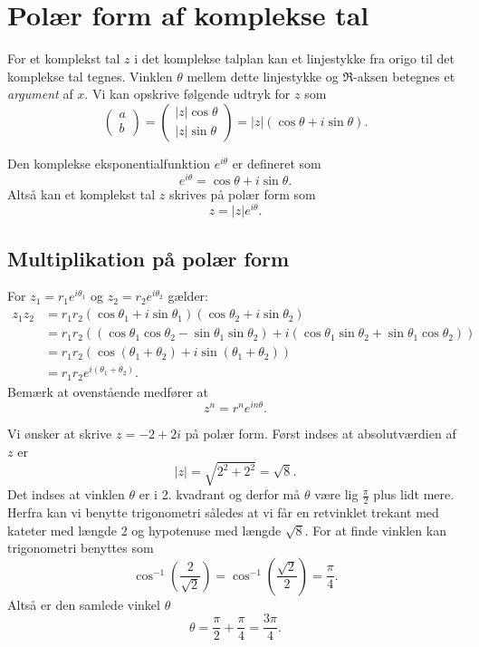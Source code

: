 \section{Polær form af komplekse tal}
For et komplekst tal $z$ i det komplekse talplan kan et linjestykke fra origo til det komplekse tal tegnes. Vinklen $\theta$ mellem dette linjestykke og $\Re$-aksen betegnes et \textit{argument} af $x$. Vi kan opskrive følgende udtryk for $z$ som
\[ 
\begin{pmatrix}
  a \\
  b
\end{pmatrix}
=
\begin{pmatrix}
  |z| \cos\theta \\
  |z| \sin\theta
\end{pmatrix}
=
|z|(\cos\theta + i \sin\theta)
.\]

\begin{definition} 
  Den komplekse eksponentialfunktion $e^{i\theta}$ er defineret som
  \[ 
  e^{i\theta} = \cos\theta + i \sin\theta
  .\]
  Altså kan et komplekst tal $z$ skrives på polær form som
  \[ 
  z = |z|e^{i \theta}
  .\]
\end{definition}

\subsection{Multiplikation på polær form}
For $z_1 = r_1 e^{i\theta_1}$ og $z_2 = r_2 e^{i\theta_2}$ gælder:
\begin{align*}
  z_1z_2 &= r_1r_2(\cos\theta_1 + i \sin\theta_1)(\cos\theta_2 + i \sin\theta_2) \\
  &= r_1r_2 \left( \left( \cos\theta_1 \cos\theta_2 - \sin\theta_1 \sin\theta_2 \right) + i \left( \cos\theta_1 \sin\theta_2 + \sin\theta_1 \cos\theta_2 \right) \right) \\
  &= r_1r_2 \left( \cos(\theta_1 + \theta_2) + i \sin(\theta_1 + \theta_2)\right) \\
  &= r_1r_2 e^{i(\theta_1 + \theta_2)}
.\end{align*}
Bemærk at ovenstående medfører at
\[ 
z^{n} = r^{n}e^{i n\theta}
.\]

\begin{eks} 
  Vi ønsker at skrive $z = -2 + 2i$ på polær form.
  \bigbreak
  Først indses at absolutværdien af $z$ er
  \[ 
  |z| = \sqrt{2^2 + 2^2} = \sqrt{8}
  .\]
  Det indses at vinklen $\theta$ er i 2. kvadrant og derfor må $\theta$ være lig $\frac{\pi}{2}$ plus lidt mere. Herfra kan vi benytte trigonometri således at vi får en retvinklet trekant med kateter med længde 2 og hypotenuse med længde $\sqrt{8}$. For at finde vinklen kan trigonometri benyttes som
  \[ 
    \cos^{-1} \left(\frac{2}{\sqrt{2}} \right) = \cos^{-1} \left( \frac{\sqrt{2}}{2} \right) = \frac{\pi}{4}
  .\]
  Altså er den samlede vinkel $\theta$
  \[ 
  \theta = \frac{\pi}{2} + \frac{\pi}{4} = \frac{3\pi}{4}
  .\]
\end{eks}

